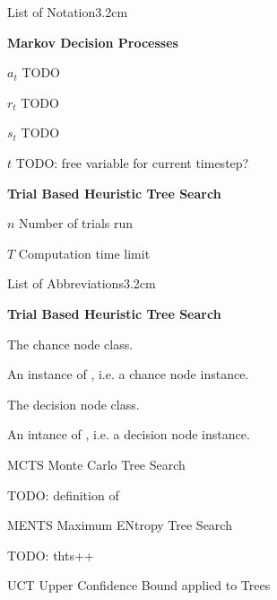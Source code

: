 \begin{mclistof}{List of Notation}{3.2cm}
    \item[\Large\textbf{Markov Decision Processes}\hfill\hfill]
    \item[$a_t$]TODO
    \item[$r_t$]TODO
    \item[$s_t$]TODO
    \item[$t$] TODO: free variable for current timestep?
    \\
    \item[\Large\textbf{Trial Based Heuristic Tree Search}\hfill\hfill]
    \item[$n$] Number of trials run
    \item[$T$] Computation time limit 

\end{mclistof} 

\begin{mclistof}{List of Abbreviations}{3.2cm}

    \item[\Large\textbf{Trial Based Heuristic Tree Search}\hfill\hfill] 
    \item[\CNODE] The chance node class.
    \item[\cnode] An instance of \CNODE, i.e. a chance node instance.
    \item[\DNODE] The decision node class.
    \item[\dnode] An intance of \DNODE, i.e. a decision node instance.
    \item[MCTS] Monte Carlo Tree Search
    \item[\mctsmode] TODO: definition of \mctsmode
    \item[MENTS] Maximum ENtropy Tree Search
    \item[\thtspp] TODO: thts++
    \item[UCT] Upper Confidence Bound applied to Trees
    

\end{mclistof} 
